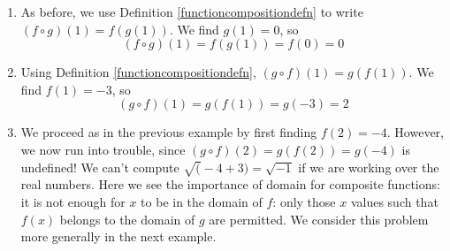 {\begin{enumerate}

\item As before, we use Definition \ref{functioncompositiondefn} to write $(f \circ g)(1) = f(g(1))$.  We find $g(1) = 0$, so \[(f \circ g)(1) = f(g(1)) = f(0) = 0 \] 

\item  Using Definition \ref{functioncompositiondefn}, $(g \circ f)(1) = g(f(1))$.  We find $f(1) = -3$, so \[(g \circ f)(1) = g(f(1)) = g(-3) = 2 \]

\item  We proceed as in the previous example by first finding $f(2)=-4$. However, we now run into trouble, since $(g\circ f)(2) = g(f(2)) = g(-4)$ is undefined! We can't compute $\sqrt(-4+3)=\sqrt{-1}$ if we are working over the real numbers. Here we see the importance of domain for composite functions: it is not enough for $x$ to be in the domain of $f$: only those $x$ values such that $f(x)$ belongs to the domain of $g$ are permitted. We consider this problem more generally in the next example.
\end{enumerate}}

\pagebreak

